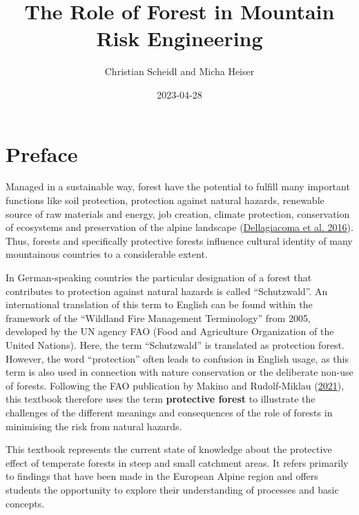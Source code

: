 \documentclass[
]{book}
\title{The Role of Forest in Mountain Risk Engineering}
\author{Christian Scheidl and Micha Heiser}
\date{2023-04-28}
\begin{document}
\maketitle

{
\setcounter{tocdepth}{1}
\tableofcontents
}
\hypertarget{preface}{%
\chapter*{Preface}\label{preface}}

Managed in a sustainable way, forest have the potential to fulfill many important functions like soil protection, protection against natural hazards, renewable source of raw materials and energy, job creation, climate protection, conservation of ecosystems and preservation of the alpine landscape (\protect\hyperlink{ref-Dellagiacoma2016}{Dellagiacoma et al. 2016}). Thus, forests and specifically protective forests influence cultural identity of many mountainous countries to a considerable extent.

In German-speaking countries the particular designation of a forest that contributes to protection against natural hazards is called ``Schutzwald''. An international translation of this term to English can be found within the framework of the ``Wildland Fire Management Terminology'' from 2005, developed by the UN agency FAO (Food and Agriculture Organization of the United Nations). Here, the term ``Schutzwald'' is translated as protection forest. However, the word ``protection'' often leads to confusion in English usage, as this term is also used in connection with nature conservation or the deliberate non-use of forests. Following the FAO publication by Makino and Rudolf-Miklau (\protect\hyperlink{ref-Makino2021}{2021}), this textbook therefore uses the term \textbf{protective forest} to illustrate the challenges of the different meanings and consequences of the role of forests in minimising the risk from natural hazards.

This textbook represents the current state of knowledge about the protective effect of temperate forests in steep and small catchment areas. It refers primarily to findings that have been made in the European Alpine region and offers students the opportunity to explore their understanding of processes and basic concepts.
\end{document}
